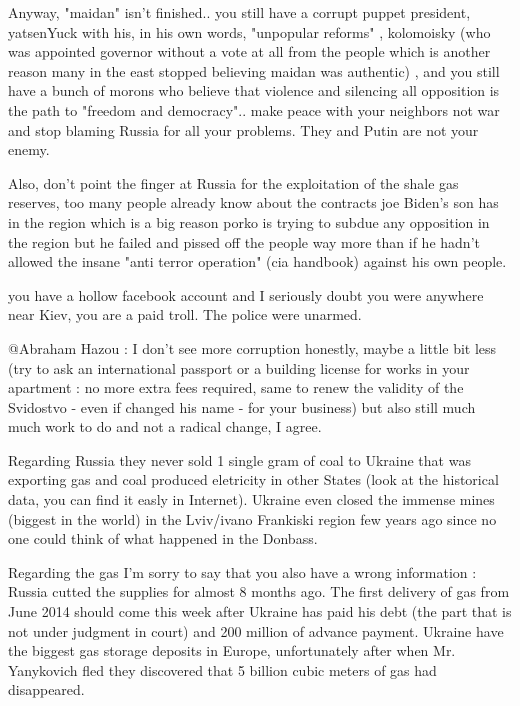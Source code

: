 \begin{itemize}
\begin{itemize}
Anyway, "maidan" isn't finished.. you still have a corrupt puppet president,
yatsenYuck with his, in his own words, "unpopular reforms" , kolomoisky (who
was appointed governor without a vote at all from the people which is another
reason many in the east stopped believing maidan was authentic) , and you still
have a bunch of morons who believe that violence and silencing all opposition
is the path to "freedom and democracy".. make peace with your neighbors not war
and stop blaming Russia for all your problems. They and Putin are not your
enemy.


Also, don't point the finger at Russia for the exploitation of the shale gas
reserves, too many people already know about the contracts joe Biden's son has
in the region which is a big reason porko is trying to subdue any opposition in
the region but he failed and pissed off the people way more than if he hadn't
allowed the insane "anti terror operation" (cia handbook) against his own
people.



you have a hollow facebook account and I seriously doubt you were anywhere near
Kiev, you are a paid troll. The police were unarmed.


@Abraham Hazou : I don't see more corruption honestly, maybe a little bit less
(try to ask an international passport or a building license for works in your
apartment : no more extra fees required, same to renew the validity of the
Svidostvo - even if changed his name - for your business) but also still much
much work to do and not a radical change, I agree. 

Regarding Russia they never sold 1 single gram of coal to Ukraine that was
exporting gas and coal produced eletricity in other States (look at the
historical data, you can find it easly in Internet). Ukraine even closed the
immense mines (biggest in the world) in the Lviv/ivano Frankiski region few
years ago since no one could think of what happened in the Donbass. 

Regarding the gas I'm sorry to say that you also have a wrong information :
Russia cutted the supplies for almost 8 months ago. The first delivery of gas
from June 2014 should come this week after Ukraine has paid his debt (the part
that is not under judgment in court) and 200 million of advance payment.
Ukraine have the biggest gas storage deposits in Europe, unfortunately after
when Mr. Yanykovich fled they discovered that 5 billion cubic meters of gas had
disappeared. 


\end{itemize}
\end{itemize}
